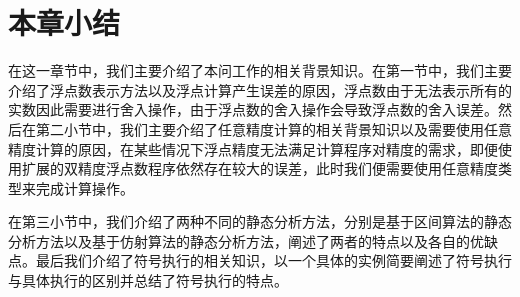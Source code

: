 \section{本章小结}

在这一章节中，我们主要介绍了本问工作的相关背景知识。在第一节中，我们主要介绍了浮点数表示方法以及浮点计算产生误差的原因，浮点数由于无法表示所有的实数因此需要进行舍入操作，由于浮点数的舍入操作会导致浮点数的舍入误差。然后在第二小节中，我们主要介绍了任意精度计算的相关背景知识以及需要使用任意精度计算的原因，在某些情况下浮点精度无法满足计算程序对精度的需求，即便使用扩展的双精度浮点数程序依然存在较大的误差，此时我们便需要使用任意精度类型来完成计算操作。

在第三小节中，我们介绍了两种不同的静态分析方法，分别是基于区间算法的静态分析方法以及基于仿射算法的静态分析方法，阐述了两者的特点以及各自的优缺点。最后我们介绍了符号执行的相关知识，以一个具体的实例简要阐述了符号执行与具体执行的区别并总结了符号执行的特点。